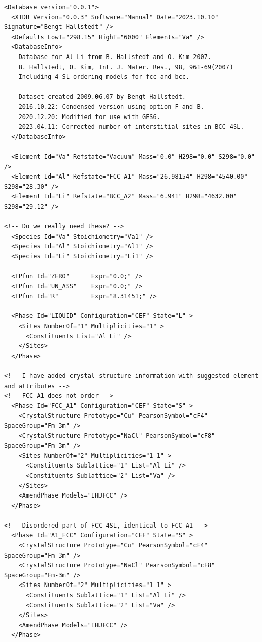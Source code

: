 \documentclass{article}
\begin{document}
\begin{appendices}
\begin{verbatim}
<Database version="0.0.1">
  <XTDB Version="0.0.3" Software="Manual" Date="2023.10.10" Signature="Bengt Hallstedt" />
  <Defaults LowT="298.15" HighT="6000" Elements="Va" />
  <DatabaseInfo>
    Database for Al-Li from B. Hallstedt and O. Kim 2007.
	B. Hallstedt, O. Kim, Int. J. Mater. Res., 98, 961-69(2007)
	Including 4-SL ordering models for fcc and bcc.
	
    Dataset created 2009.06.07 by Bengt Hallstedt.
    2016.10.22: Condensed version using option F and B.
    2020.12.20: Modified for use with GES6.
    2023.04.11: Corrected number of interstitial sites in BCC_4SL.
  </DatabaseInfo>

  <Element Id="Va" Refstate="Vacuum" Mass="0.0" H298="0.0" S298="0.0" />
  <Element Id="Al" Refstate="FCC_A1" Mass="26.98154" H298="4540.00" S298="28.30" />
  <Element Id="Li" Refstate="BCC_A2" Mass="6.941" H298="4632.00" S298="29.12" />

<!-- Do we really need these? -->
  <Species Id="Va" Stoichiometry="Va1" />
  <Species Id="Al" Stoichiometry="Al1" />
  <Species Id="Li" Stoichiometry="Li1" />

  <TPfun Id="ZERO"      Expr="0.0;" />
  <TPfun Id="UN_ASS"    Expr="0.0;" />
  <TPfun Id="R"         Expr="8.31451;" />

  <Phase Id="LIQUID" Configuration="CEF" State="L" >
    <Sites NumberOf="1" Multiplicities="1" >
      <Constituents List="Al Li" />
    </Sites>
  </Phase>

<!-- I have added crystal structure information with suggested element and attributes -->
<!-- FCC_A1 does not order -->
  <Phase Id="FCC_A1" Configuration="CEF" State="S" >
	<CrystalStructure Prototype="Cu" PearsonSymbol="cF4" SpaceGroup="Fm-3m" />
	<CrystalStructure Prototype="NaCl" PearsonSymbol="cF8" SpaceGroup="Fm-3m" />
    <Sites NumberOf="2" Multiplicities="1 1" >
      <Constituents Sublattice="1" List="Al Li" />
      <Constituents Sublattice="2" List="Va" />
    </Sites>
    <AmendPhase Models="IHJFCC" />
  </Phase>

<!-- Disordered part of FCC_4SL, identical to FCC_A1 -->
  <Phase Id="A1_FCC" Configuration="CEF" State="S" >
	<CrystalStructure Prototype="Cu" PearsonSymbol="cF4" SpaceGroup="Fm-3m" />
	<CrystalStructure Prototype="NaCl" PearsonSymbol="cF8" SpaceGroup="Fm-3m" />
    <Sites NumberOf="2" Multiplicities="1 1" >
      <Constituents Sublattice="1" List="Al Li" />
      <Constituents Sublattice="2" List="Va" />
    </Sites>
    <AmendPhase Models="IHJFCC" />
  </Phase>


\end{verbatim}
\end{appendices}
\end{document}
